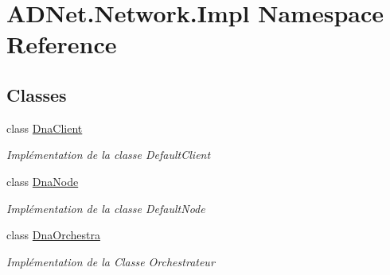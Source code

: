 \hypertarget{namespace_a_d_net_1_1_network_1_1_impl}{}\section{A\+D\+Net.\+Network.\+Impl Namespace Reference}
\label{namespace_a_d_net_1_1_network_1_1_impl}
\subsection*{Classes}
\begin{DoxyCompactItemize}
\item 
class \hyperlink{class_a_d_net_1_1_network_1_1_impl_1_1_dna_client}{Dna\+Client}
\begin{DoxyCompactList}\small\item\em Implémentation de la classe Default\+Client \end{DoxyCompactList}\item 
class \hyperlink{class_a_d_net_1_1_network_1_1_impl_1_1_dna_node}{Dna\+Node}
\begin{DoxyCompactList}\small\item\em Implémentation de la classe Default\+Node \end{DoxyCompactList}\item 
class \hyperlink{class_a_d_net_1_1_network_1_1_impl_1_1_dna_orchestra}{Dna\+Orchestra}
\begin{DoxyCompactList}\small\item\em Implémentation de la Classe Orchestrateur \end{DoxyCompactList}\end{DoxyCompactItemize}

